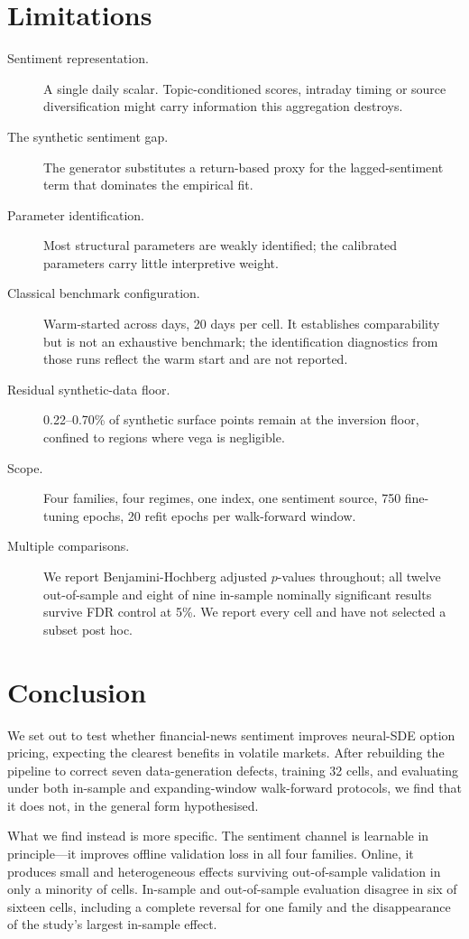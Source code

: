 \documentclass[11pt,a4paper]{article}
\begin{document}
\section{Limitations}
\begin{description}
\item[Sentiment representation.] A single daily scalar. Topic-conditioned
scores, intraday timing or source diversification might carry information this
aggregation destroys.
\item[The synthetic sentiment gap.] The generator substitutes a return-based
proxy for the lagged-sentiment term that dominates the empirical fit.
\item[Parameter identification.] Most structural parameters are weakly
identified; the calibrated parameters carry little interpretive weight.
\item[Classical benchmark configuration.] Warm-started across days, 20 days per
cell. It establishes comparability but is not an exhaustive benchmark; the
identification diagnostics from those runs reflect the warm start and are not
reported.
\item[Residual synthetic-data floor.] 0.22--0.70\% of synthetic surface points
remain at the inversion floor, confined to regions where vega is negligible.
\item[Scope.] Four families, four regimes, one index, one sentiment source, 750
fine-tuning epochs, 20 refit epochs per walk-forward window.
\item[Multiple comparisons.] We report Benjamini-Hochberg adjusted $p$-values
throughout; all twelve out-of-sample and eight of nine in-sample nominally
significant results survive FDR control at 5\%. We report every cell and have
not selected a subset post hoc.
\end{description}

\section{Conclusion}
We set out to test whether financial-news sentiment improves neural-SDE option
pricing, expecting the clearest benefits in volatile markets. After rebuilding
the pipeline to correct seven data-generation defects, training 32 cells, and
evaluating under both in-sample and expanding-window walk-forward protocols, we
find that it does not, in the general form hypothesised.

What we find instead is more specific. The sentiment channel is learnable in
principle---it improves offline validation loss in all four families. Online, it
produces small and heterogeneous effects surviving out-of-sample validation in
only a minority of cells. In-sample and out-of-sample evaluation disagree in six
of sixteen cells, including a complete reversal for one family and the
disappearance of the study's largest in-sample effect.
\end{document}
